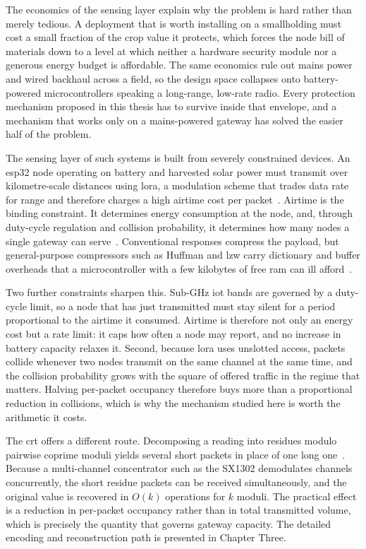 \documentclass[12pt,a4paper,oneside]{book}
\begin{document}
The economics of the sensing layer explain why the problem is hard rather than
merely tedious. A deployment that is worth installing on a smallholding must
cost a small fraction of the crop value it protects, which forces the node bill
of materials down to a level at which neither a hardware security module nor a
generous energy budget is affordable. The same economics rule out mains power
and wired backhaul across a field, so the design space collapses onto
battery-powered microcontrollers speaking a long-range, low-rate radio. Every
protection mechanism proposed in this thesis has to survive inside that
envelope, and a mechanism that works only on a mains-powered gateway has solved
the easier half of the problem.

The sensing layer of such systems is built from severely constrained devices.
An \gls{esp32} node operating on battery and harvested solar power must
transmit over kilometre-scale distances using \gls{lora}, a modulation scheme
that trades data rate for range and therefore charges a high airtime cost per
packet~\cite{raza2018lorawan, adelantado2017understanding}. Airtime is the
binding constraint. It determines energy consumption at the node, and, through
duty-cycle regulation and collision probability, it determines how many nodes a
single gateway can serve~\cite{mohammed2025loraEnergy}. Conventional responses
compress the payload, but general-purpose compressors such as Huffman and
\gls{lzw} carry dictionary and buffer overheads that a microcontroller with a
few kilobytes of free \gls{ram} can ill
afford~\cite{marcelloni2009energy, chen2025compression}.

Two further constraints sharpen this. Sub-GHz \gls{iot} bands are governed by a
duty-cycle limit, so a node that has just transmitted must stay silent for a
period proportional to the airtime it consumed. Airtime is therefore not only
an energy cost but a rate limit: it caps how often a node may report, and no
increase in battery capacity relaxes it. Second, because \gls{lora} uses
unslotted access, packets collide whenever two nodes transmit on the same
channel at the same time, and the collision probability grows with the square
of offered traffic in the regime that matters. Halving per-packet occupancy
therefore buys more than a proportional reduction in collisions, which is why
the mechanism studied here is worth the arithmetic it costs.

The \gls{crt} offers a different route. Decomposing a reading into residues
modulo pairwise coprime moduli yields several short packets in place of one
long one~\cite{garner1959residue, ding1996remainder}. Because a multi-channel
concentrator such as the SX1302 demodulates channels concurrently, the short
residue packets can be received simultaneously, and the original value is
recovered in $O(k)$ operations for $k$ moduli. The practical effect is a
reduction in per-packet occupancy rather than in total transmitted volume,
which is precisely the quantity that governs gateway capacity. The detailed
encoding and reconstruction path is presented in Chapter Three.
\end{document}
